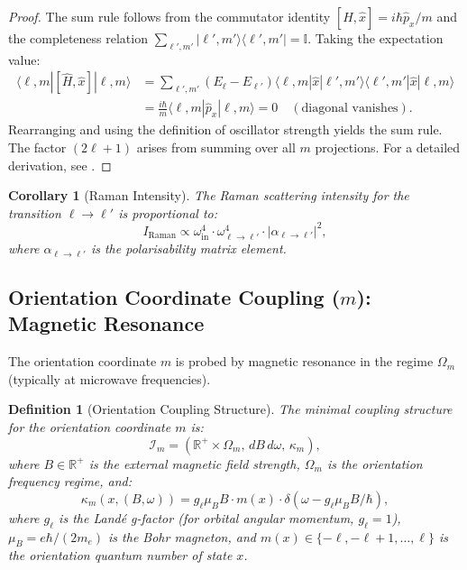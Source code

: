 \documentclass[twocolumn,10pt,a4paper]{article}
\newtheorem{corollary}[theorem]{Corollary}
\newtheorem{definition}[theorem]{Definition}
\theoremstyle{remark}
\newcommand{\Reals}{\mathbb{R}}
\begin{document}
\begin{proof}
The sum rule follows from the commutator identity $[\hat{H}, \hat{x}] = i\hbar \hat{p}_x / m$ and the completeness relation $\sum_{\ell', m'} |\ell', m'\rangle \langle \ell', m'| = \mathbb{I}$. Taking the expectation value:
\begin{align}
\langle \ell, m | [\hat{H}, \hat{x}] | \ell, m \rangle &= \sum_{\ell', m'} (E_\ell - E_{\ell'}) \langle \ell, m | \hat{x} | \ell', m' \rangle \langle \ell', m' | \hat{x} | \ell, m \rangle \\
&= \frac{i\hbar}{m} \langle \ell, m | \hat{p}_x | \ell, m \rangle = 0 \quad (\text{diagonal vanishes}).
\end{align}
Rearranging and using the definition of oscillator strength yields the sum rule. The factor $(2\ell + 1)$ arises from summing over all $m$ projections. For a detailed derivation, see \citet{BetheJackiw1968}.
\end{proof}

\begin{corollary}[Raman Intensity]
\label{cor:raman_intensity}
The Raman scattering intensity for the transition $\ell \to \ell'$ is proportional to:
\begin{equation}
I_{\text{Raman}} \propto \omega_{\text{in}}^4 \cdot \omega_{\ell \to \ell'}^4 \cdot |\alpha_{\ell \to \ell'}|^2,
\end{equation}
where $\alpha_{\ell \to \ell'}$ is the polarisability matrix element.
\end{corollary}

\subsection{Orientation Coordinate Coupling ($m$): Magnetic Resonance}

The orientation coordinate $m$ is probed by magnetic resonance in the regime $\Omega_m$ (typically at microwave frequencies).

\begin{definition}[Orientation Coupling Structure]
\label{def:orientation_coupling}
The minimal coupling structure for the orientation coordinate $m$ is:
\begin{equation}
\mathcal{I}_m = \left( \Reals^+ \times \Omega_m, \, dB \, d\omega, \, \kappa_m \right),
\end{equation}
where $B \in \Reals^+$ is the external magnetic field strength, $\Omega_m$ is the orientation frequency regime, and:
\begin{equation}
\kappa_m(x, (B, \omega)) = g_\ell \mu_B B \cdot m(x) \cdot \delta(\omega - g_\ell \mu_B B / \hbar),
\end{equation}
where $g_\ell$ is the Landé g-factor (for orbital angular momentum, $g_\ell = 1$), $\mu_B = e\hbar/(2m_e)$ is the Bohr magneton, and $m(x) \in \{-\ell, -\ell+1, \ldots, \ell\}$ is the orientation quantum number of state $x$.
\end{definition}
\end{document}
